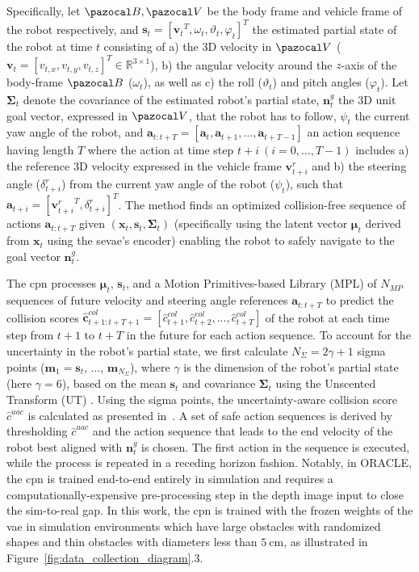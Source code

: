 Specifically, let $\Bs,\Vs$ be the body frame and vehicle frame of the robot respectively, and $\mathbf{s}_t = [{\mathbf{v}_t}^T, \omega_t, \vartheta_t, \varphi_t]^T $ the estimated partial state of the robot at time $t$ consisting of a) the $3$D velocity in $\Vs$ ($\mathbf{v}_t=[v_{t,x}, v_{t,y}, v_{t,z}]^T \in \mathbb{R}^{3 \times 1}$), b) the angular velocity around the $z$-axis of the body-frame $\Bs$ ($\omega_t$), as well as c) the roll ($\vartheta_t$) and pitch angles ($\varphi_t$). Let $\boldsymbol{\Sigma}_t$ denote the covariance of the estimated robot’s partial state, $\mathbf{n}^g_t$ the $3$D unit goal vector, expressed in $\Vs$, that the robot has to follow, $\psi_t$ the current yaw angle of the robot, and $\mathbf{a}_{t:t+T}=[\mathbf{a}_t, \mathbf{a}_{t+1},\hdots,\mathbf{a}_{t+T-1}]$ an action sequence having length $T$ where the action at time step $t+i~(i=0,\hdots,T-1)$ includes a) the reference $3$D velocity expressed in the vehicle frame $\mathbf{v}^r_{t+i}$ and
b) the steering angle ($\delta^r_{t+i}$) from the current yaw angle of the robot ($\psi_{t}$), such that $\mathbf{a}_{t+i}=[{\mathbf{v}^r_{t+i}}^T, \delta^r_{t+i}]^T$.
The method finds an optimized collision-free sequence of actions $\mathbf{a}_{t:t+T}$ given $(\mathbf{x}_t,\mathbf{s}_t,\boldsymbol{\Sigma}_t)$ (specifically using the latent vector $\bm{\mu}_t$ derived from $\mathbf{x}_t$ using the \ac{sevae}'s encoder) enabling the robot to safely navigate to the goal vector $\mathbf{n}^g_t$. 

The \ac{cpn} processes $\bm{\mu}_t$, $\mathbf{s}_t$, and a Motion Primitives-based Library (MPL) of $N_{MP}$ sequences of future velocity and steering angle references $\mathbf{a}_{t:t+T}$ to predict the collision scores $\hat{\mathbf{c}}^{col}_{t+1:t+T+1}=[\hat{c}^{col}_{t+1}, \hat{c}^{col}_{t+2},\hdots,\hat{c}^{col}_{t+T}]$ of the robot at each time step from $t+1$ to $t+T$ in the future for each action sequence. 
To account for the uncertainty in the robot's partial state, we first calculate $N_{\Sigma} = 2\gamma + 1$ sigma points ($\mathbf{m}_1=\mathbf{s}_t$, $\hdots$, $\mathbf{m}_{N_{\Sigma}}$), where $\gamma$ is the dimension of the robot's partial state (here $\gamma=6$), based on the mean $\mathbf{s}_t$ and covariance $\bm{\Sigma}_t$ using the Unscented Transform (UT) \cite{Julier1997unscented}. Using the sigma points, the uncertainty-aware collision score $\hat{c}^{uac}$ is calculated as presented in~\cite{ORACLE_ICRA2022}. A set of safe action sequences is derived by thresholding $\hat{c}^{uac}$ and the action sequence that leads to the end velocity of the robot best aligned with $\mathbf{n}^g_t$ is chosen. The first action in the sequence is executed, while the process is repeated in a receding horizon fashion. Notably, in ORACLE, the \ac{cpn} is trained end-to-end entirely in simulation and requires a computationally-expensive pre-processing step in the depth image input to close the sim-to-real gap. In this work, the \ac{cpn} is trained with the frozen weights of the \ac{vae} in simulation environments which have large obstacles with randomized shapes and thin obstacles with diameters less than $5~\textrm{cm}$, as illustrated in Figure~\ref{fig:data_collection_diagram}.3.

